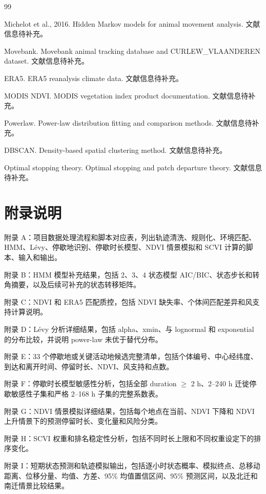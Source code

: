 \documentclass[UTF8,a4paper,12pt]{ctexart}
\begin{document}
\begin{thebibliography}{99}

Michelot et al., 2016. Hidden Markov models for animal movement analysis. 文献信息待补充。

Movebank. Movebank animal tracking database and CURLEW\_VLAANDEREN dataset. 文献信息待补充。

ERA5. ERA5 reanalysis climate data. 文献信息待补充。

MODIS NDVI. MODIS vegetation index product documentation. 文献信息待补充。

Powerlaw. Power-law distribution fitting and comparison methods. 文献信息待补充。

DBSCAN. Density-based spatial clustering method. 文献信息待补充。

Optimal stopping theory. Optimal stopping and patch departure theory. 文献信息待补充。

\end{thebibliography}

\appendix

\section{附录说明}

附录 A：项目数据处理流程和脚本对应表，列出轨迹清洗、规则化、环境匹配、HMM、L\'evy、停歇地识别、停歇时长模型、NDVI 情景模拟和 SCVI 计算的脚本、输入和输出。

附录 B：HMM 模型补充结果，包括 2、3、4 状态模型 AIC/BIC、状态步长和转角摘要，以及后续可补充的状态转移矩阵。

附录 C：NDVI 和 ERA5 匹配质控，包括 NDVI 缺失率、个体间匹配差异和风支持计算说明。

附录 D：L\'evy 分析详细结果，包括 alpha、xmin、与 lognormal 和 exponential 的分布比较，并说明 power-law 未优于替代分布。

附录 E：33 个停歇地或关键活动地候选完整清单，包括个体编号、中心经纬度、到达和离开时间、停留时长、NDVI、风支持和点数。

附录 F：停歇时长模型敏感性分析，包括全部 duration $\geq$ 2 h、2--240 h 迁徙停歇敏感性子集和严格 2--168 h 子集的完整系数表。

附录 G：NDVI 情景模拟详细结果，包括每个地点在当前、NDVI 下降和 NDVI 上升情景下的预测停留时长、变化量和风险分类。

附录 H：SCVI 权重和排名稳定性分析，包括不同时长上限和不同权重设定下的排序变化。

附录 I：短期状态预测和轨迹模拟输出，包括逐小时状态概率、模拟终点、总移动距离、位移分量、均值、方差、95\% 均值置信区间、95\% 预测区间，以及北迁和南迁情景比较结果。
\end{document}
